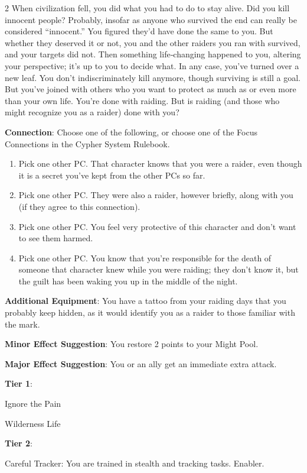 \begin{multicols}{2}
When civilization fell, you did what you had to do to stay alive. Did you kill innocent people? Probably, insofar as anyone who survived the end can really be considered “innocent.” You figured they’d have done the same to you. But whether they deserved it or not, you and the other raiders you ran with survived, and your targets did not. Then something life‑changing happened to you, altering your perspective; it’s up to you to decide what. In any case, you’ve turned over a new leaf. You don’t indiscriminately kill anymore, though surviving is still a goal. But you’ve joined with others who you want to protect as much as or even more than your own life. You’re done with raiding. But is raiding (and those who might recognize you as a raider) done with you?

\textbf{Connection}: Choose one of the following, or choose one of the Focus Connections in the Cypher System Rulebook.

\begin{enumerate}
\item Pick one other PC. That character knows that you were a raider, even though it is a secret you’ve kept from the other PCs so far.
\item Pick one other PC. They were also a raider, however briefly, along with you (if they agree to this connection).
\item Pick one other PC. You feel very protective of this character and don’t want to see them harmed.
\item Pick one other PC. You know that you’re responsible for the death of someone that character knew while you were raiding; they don’t know it, but the guilt has been waking you up in the middle of the night.
\end{enumerate}

\textbf{Additional Equipment}: You have a tattoo from your raiding days that you probably keep hidden, as it would identify you as a raider to those familiar with the mark.

\textbf{Minor Effect Suggestion}: You restore 2 points to your Might Pool.

\textbf{Major Effect Suggestion}: You or an ally get an immediate extra attack.

\textbf{Tier 1}:

Ignore the Pain 

Wilderness Life 

\textbf{Tier 2}:
 
Careful Tracker: You are trained in stealth and tracking tasks. Enabler. 


\end{multicols}
